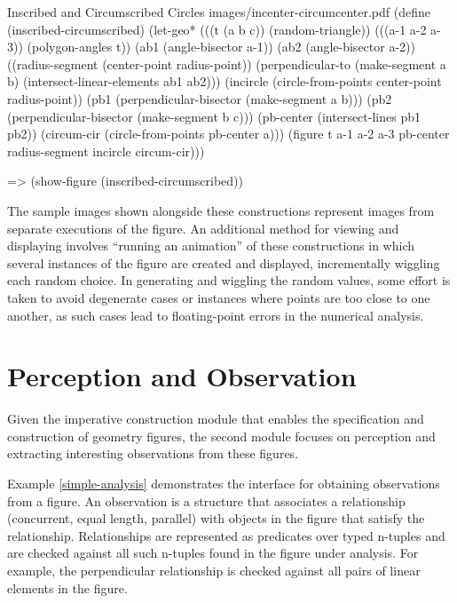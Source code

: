 \begin{pdf-example}
[label=incircle-circumcircle-fig]
{Inscribed and Circumscribed Circles}
{images/incenter-circumcenter.pdf}
(define (inscribed-circumscribed)
  (let-geo* (((t (a b c)) (random-triangle))
             (((a-1 a-2 a-3)) (polygon-angles t))
             (ab1 (angle-bisector a-1))
             (ab2 (angle-bisector a-2))
             ((radius-segment (center-point radius-point))
              (perpendicular-to (make-segment a b)
                                (intersect-linear-elements ab1 ab2)))
             (incircle (circle-from-points
                        center-point
                        radius-point))
             (pb1 (perpendicular-bisector
                   (make-segment a b)))
             (pb2 (perpendicular-bisector
                   (make-segment b c)))
             (pb-center (intersect-lines pb1 pb2))
             (circum-cir (circle-from-points
                          pb-center
                          a)))
    (figure t a-1 a-2 a-3
            pb-center
            radius-segment
            incircle
            circum-cir)))

=> (show-figure (inscribed-circumscribed))
\end{pdf-example}

The sample images shown alongside these constructions represent images
from separate executions of the figure. An additional method for
viewing and displaying involves ``running an animation'' of these
constructions in which several instances of the figure are created and
displayed, incrementally wiggling each random choice. In generating
and wiggling the random values, some effort is taken to avoid
degenerate cases or instances where points are too close to one
another, as such cases lead to floating-point errors in the numerical
analysis.

\section{Perception and Observation}

Given the imperative construction module that enables the
specification and construction of geometry figures, the second module
focuses on perception and extracting interesting observations from
these figures.

Example \ref{simple-analysis} demonstrates the interface for obtaining
observations from a figure. An observation is a structure that
associates a relationship (concurrent, equal length, parallel) with
objects in the figure that satisfy the relationship. Relationships are
represented as predicates over typed n-tuples and are checked against
all such n-tuples found in the figure under analysis. For example, the
perpendicular relationship is checked against all pairs of linear elements
in the figure.

